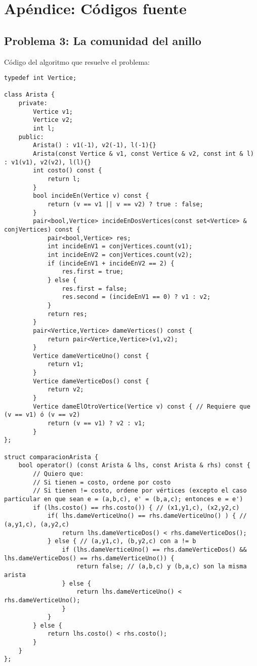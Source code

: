 \section{Apéndice: Códigos fuente}

\subsection{Problema 3: La comunidad del anillo}

Código del algoritmo que resuelve el problema:
\begin{lstlisting}[frame=single]
typedef int Vertice;

class Arista {
    private:
        Vertice v1;
        Vertice v2;
        int l;
    public:
        Arista() : v1(-1), v2(-1), l(-1){}
        Arista(const Vertice & v1, const Vertice & v2, const int & l) : v1(v1), v2(v2), l(l){}
        int costo() const {
            return l;
        }
        bool incideEn(Vertice v) const {
            return (v == v1 || v == v2) ? true : false;
        }
        pair<bool,Vertice> incideEnDosVertices(const set<Vertice> & conjVertices) const {
            pair<bool,Vertice> res;
            int incideEnV1 = conjVertices.count(v1);
            int incideEnV2 = conjVertices.count(v2);
            if (incideEnV1 + incideEnV2 == 2) {
                res.first = true;
            } else {
                res.first = false;
                res.second = (incideEnV1 == 0) ? v1 : v2;
            }
            return res;
        }
        pair<Vertice,Vertice> dameVertices() const {
            return pair<Vertice,Vertice>(v1,v2);
        }
        Vertice dameVerticeUno() const {
            return v1;
        }
        Vertice dameVerticeDos() const {
            return v2;
        }
        Vertice dameElOtroVertice(Vertice v) const { // Requiere que (v == v1) ó (v == v2)
            return (v == v1) ? v2 : v1;
        }
};

struct comparacionArista {
    bool operator() (const Arista & lhs, const Arista & rhs) const {
        // Quiero que:
        // Si tienen = costo, ordene por costo
        // Si tienen != costo, ordene por vértices (excepto el caso particular en que sean e = (a,b,c), e' = (b,a,c); entonces e = e')
        if (lhs.costo() == rhs.costo()) { // (x1,y1,c), (x2,y2,c)
            if( lhs.dameVerticeUno() == rhs.dameVerticeUno() ) { // (a,y1,c), (a,y2,c)
                return lhs.dameVerticeDos() < rhs.dameVerticeDos();
            } else { // (a,y1,c), (b,y2,c) con a != b
                if (lhs.dameVerticeUno() == rhs.dameVerticeDos() && lhs.dameVerticeDos() == rhs.dameVerticeUno()) {
                    return false; // (a,b,c) y (b,a,c) son la misma arista
                } else {
                    return lhs.dameVerticeUno() < rhs.dameVerticeUno();
                }
            }
        } else {
            return lhs.costo() < rhs.costo();
        }
    }
};


\end{lstlisting}

